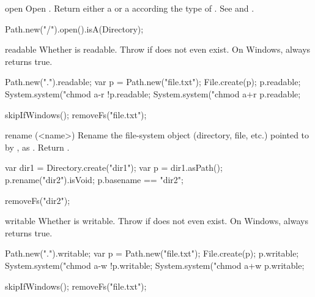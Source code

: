 \begin{urbiscriptapi}
\item[open] Open \this. Return either a  or a 
  according the type of \this. See  and
  .
\begin{urbiassert}
Path.new("/").open().isA(Directory);
\end{urbiassert}


\item[readable]
  Whether \this is readable.  Throw if does not even exist.  On Windows,
  always returns true.
\begin{urbiassert}[firstnumber=1]
Path.new(".").readable;
var p = Path.new("file.txt");
File.create(p);
p.readable;
System.system("chmod a-r %
!p.readable;
System.system("chmod a+r %
p.readable;
\end{urbiassert}
\begin{urbicomment}
skipIfWindows();
removeFs("file.txt");
\end{urbicomment}


\item[rename](<name>)%
  Rename the file-system object (directory, file, etc.) pointed to by \this,
  as .  Return .
\begin{urbiassert}[firstnumber=1]
var dir1 = Directory.create("dir1");
var p = dir1.asPath();
p.rename("dir2").isVoid;
p.basename == "dir2";
\end{urbiassert}
\begin{urbicomment}
removeFs("dir2");
\end{urbicomment}


\item[writable]%
  Whether \this is writable.  Throw if does not even exist.  On Windows,
  always returns true.
\begin{urbiassert}[firstnumber=1]
Path.new(".").writable;
var p = Path.new("file.txt");
File.create(p);
p.writable;
System.system("chmod a-w %
!p.writable;
System.system("chmod a+w %
p.writable;
\end{urbiassert}
\begin{urbicomment}
skipIfWindows();
removeFs("file.txt");
\end{urbicomment}
\end{urbiscriptapi}



